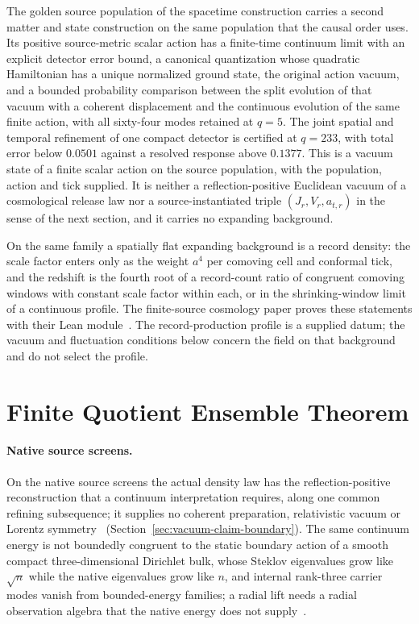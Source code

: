 \documentclass[11pt]{article}
\theoremstyle{remark}
\theoremstyle{plain}
\begin{document}
The golden source population of the spacetime construction carries a second
matter and state construction on the same population that the causal order
uses. Its positive source-metric scalar action has a finite-time continuum
limit with an explicit detector error bound, a canonical quantization whose
quadratic Hamiltonian has a unique normalized ground state, the original
action vacuum, and a bounded probability comparison between the split
evolution of that vacuum with a coherent displacement and the continuous
evolution of the same finite action, with all sixty-four modes retained at
\(q=5\). The joint spatial and temporal refinement of one compact detector is
certified at \(q=233\), with total error below \(0.0501\) against a resolved
response above \(0.1377\). This is a vacuum state of a finite scalar action on
the source population, with the population, action and tick supplied. It is
neither a reflection-positive Euclidean vacuum of a cosmological release law
nor a source-instantiated triple \((J_r,V_r,a_{t,r})\) in the sense of the
next section, and it carries no expanding background.

On the same family a spatially flat expanding background is a record
density: the scale factor enters only as the weight \(a^4\) per comoving
cell and conformal tick, and the redshift is the fourth root of a
record-count ratio of congruent comoving windows with constant scale factor
within each, or in the shrinking-window limit of a continuous profile. The
finite-source
cosmology paper proves these statements with their Lean
module~\cite{ophcmb}. The record-production profile is a supplied datum; the
vacuum and fluctuation conditions below concern the field on that background
and do not select the profile.

\section{Finite Quotient Ensemble Theorem}



\paragraph{Native source screens.}
On the native source screens the actual density law has the
reflection-positive reconstruction that a continuum interpretation requires,
along one common refining subsequence; it supplies no coherent preparation,
relativistic vacuum or Lorentz symmetry~\cite{ophtimefields}
(Section~\ref{sec:vacuum-claim-boundary}). The same continuum energy is not
boundedly congruent to the static boundary action of a smooth compact
three-dimensional Dirichlet bulk, whose Steklov eigenvalues grow like
\(\sqrt n\) while the native eigenvalues grow like \(n\), and internal
rank-three carrier modes vanish from bounded-energy families; a radial lift
needs a radial observation algebra that the native energy does not
supply~\cite{ophcontinuum}.
\end{document}
